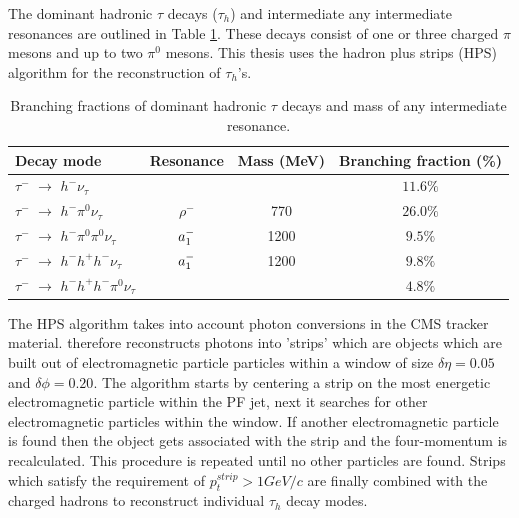 The dominant hadronic $\tau$ decays ($\tau_{h}$) 
and intermediate any intermediate resonances are 
outlined in Table \ref{tab:decay_modes}. 
These decays consist of one or three charged $\pi$ mesons and up to two $\pi^{0}$ mesons.
This thesis uses the hadron plus strips (HPS) algorithm for the reconstruction of 
$\tau_{h}$'s. %
\begin{table}[b]
\begin{center}
\begin{tabular}{|l|c|c|c|}
\hline
Decay mode & Resonance & Mass (MeV) &  Branching fraction (\%) \\
\hline
$\tau^{-}$  $\rightarrow $  $h^{-} \nu_{\tau}$ &  &  & $11.6\%$ \\
$\tau^{-}$  $\rightarrow $  $h^{-} \pi^{0}  \nu_{\tau}$ & $\rho^{-}$ & 770 & $26.0\%$ \\
$\tau^{-}$  $\rightarrow $  $h^{-} \pi^{0}\pi^{0}  \nu_{\tau}$ & $a_{\rm{1}}^{-}$ & 1200 & $9.5\%$ \\
$\tau^{-}$  $\rightarrow $  $h^{-} h^{+} h^{-} \nu_{\tau}$ & $a_{\rm{1}}^{-}$  & 1200 & $9.8\%$ \\
$\tau^{-}$  $\rightarrow $  $h^{-} h^{+} h^{-}\pi^{0}  \nu_{\tau}$ & & & $4.8\%$ \\
      \hline
\end{tabular}
\caption{
   Branching fractions of dominant hadronic $\tau$ decays and mass of any intermediate resonance. 
   }
\label{tab:decay_modes}
\end{center}
\end{table}
The HPS algorithm takes into account photon conversions in the CMS tracker
material. %
therefore %
reconstructs photons into 'strips' which are objects which are built%
out of electromagnetic particle particles within a window of size $\delta\eta=0.05$
and $\delta\phi=0.20$. The algorithm starts by centering a strip on the
most energetic electromagnetic particle within the PF jet, next it searches
for other electromagnetic particles within the window. If another electromagnetic
particle is found then the object gets associated with the strip and
the four-momentum is recalculated. This procedure is repeated until no other
particles are found. Strips which satisfy the requirement of $p_{t}^{strip}>1GeV/c$
are finally combined with the charged hadrons to reconstruct individual
$\tau_{h}$ decay modes.

